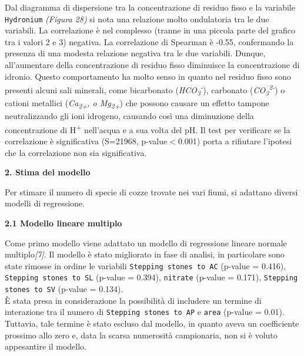 \documentclass{article} %
\begin{document}
Dal diagramma di dispersione tra la concentrazione di residuo fisso e la variabile \texttt{Hydronium} \textit{(Figura 28)} si nota una relazione molto ondulatoria tra le due variabili.
La correlazione è nel complesso (tranne in una piccola parte del grafico tra i valori 2 e 3) negativa.
La correlazione di Spearman è -0.55, confermando la presenza di una modesta relazione negativa tra le due variabili. Dunque, all'aumentare della concentrazione di residuo fisso diminuisce la concentrazione di idronio.
Questo comportamento ha molto senso in quanto nel residuo fisso sono presenti alcuni sali minerali, come bicarbonato (\textit{HCO\textsubscript{3}\textsuperscript{-}}), carbonato (\textit{CO\textsubscript{3}\textsuperscript{2-}}) o cationi metallici (\textit{Ca\textsubscript{2+}, o Mg\textsubscript{2+}}) che possono causare un effetto tampone neutralizzando gli ioni idrogeno, causando così una diminuzione della concentrazione di H\textsuperscript{+} nell'acqua e a sua volta del pH.
Il test per verificare se la correlazione è significativa (S=21968, p-value$<$0.001) porta a rifiutare l'ipotesi che la correlazione non sia significativa.

\newpage
\begin{flushleft}
    \textbf{\Huge 2. \: Stima del modello}
    \vskip 10pt
\end{flushleft}

Per stimare il numero di specie di cozze trovate nei vari fiumi, si adattano diversi modelli di regressione.

\vskip 20pt
\begin{flushleft}
    \textbf{\Large 2.1 \: Modello lineare multiplo}
\end{flushleft}
\vskip 10pt

Come primo modello viene adattato un modello di regressione lineare normale multiplo\textit{[7]}. Il modello è stato migliorato in fase di analisi, in particolare sono state rimosse in ordine le variabili \texttt{Stepping stones to AC} (p-value = 0.416), \texttt{Stepping stones to SL} (p-value = 0.394), \texttt{nitrate} (p-value = 0.171),   \texttt{Stepping stones to SV} (p-value = 0.134). \\
È stata presa in considerazione la possibilità di includere un termine di interazione tra il numero di \texttt{Stepping stones to AP} e \texttt{area} (p-value = 0.01). Tuttavia, tale termine è stato escluso dal modello, in quanto aveva un coefficiente prossimo allo zero e, data la scarsa numerosità campionaria, non si è voluto appesantire il modello.
\end{document}
